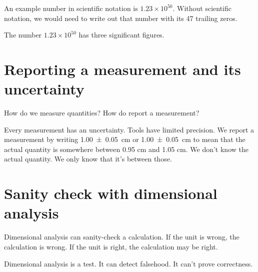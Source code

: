 An example number in scientific notation is \( 1.23 \times 10^{50} \).
Without scientific notation, we would need to write out that number with its 47 trailing zeros.

The number \( 1.23 \times 10^{50} \) has three significant figures.

\section{Reporting a measurement and its uncertainty}

How do we measure quantities?
How do report a measurement?

Every measurement has an uncertainty.
Tools have limited precision.
We report a measurement by writing \SI{1.00(5)}{cm} or \SI[separate-uncertainty]{1.00+-0.05}{cm}
to mean that the actual quantity is somewhere between 0.95 cm and 1.05 cm.
We don't know the actual quantity.
We only know that it's between those.

\section{Sanity check with dimensional analysis}

Dimensional analysis can sanity-check a calculation.
If the unit is wrong, the calculation is wrong.
If the unit is right, the calculation may be right.

Dimensional analysis is a test.
It can detect falsehood.
It can't prove correctness.
